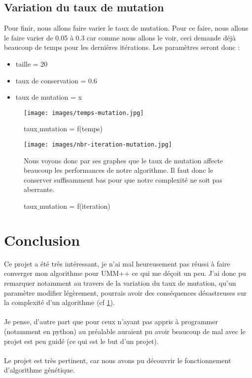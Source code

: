 \documentclass[french,12pt,a4paper]{report}
\begin{document}
\newpage

\section{Variation du taux de mutation}
\label{taux mutation}
Pour finir, nous allons faire varier le taux de mutation. Pour ce faire, nous allons le faire varier de 0.05 à 0.3 car comme nous allons le voir, ceci demande déjà beaucoup de temps pour les dernières itérations. Les paramètres seront donc :
\begin{itemize}
\item taille = 20
\item taux de conservation = 0.6
\item taux de mutation = x
\end{itemize}
\begin{figure}[!htb]
\begin{minipage}{0.48\textwidth}
\centering
\texttt{[image: images/temps-mutation.jpg]}
\caption{taux$\_$mutation = f(temps)}\label{Fig:Data1-3}
\end{minipage}\hfill
\begin{minipage}{0.48\textwidth}
\centering
\texttt{[image: images/nbr-iteration-mutation.jpg]}
\caption{taux$\_$mutation = f(iteration)}\label{Fig:Data2-3}
\end{minipage}
Nous voyons donc par ses graphes que le taux de mutation affecte beaucoup les performances de notre algorithme. Il faut donc le conserver suffisamment bas pour que notre complexité ne soit pas aberrante.
\end{figure}

\chapter*{Conclusion}

Ce projet a été très intéressant, je n'ai mal heureusement pas réussi à faire converger mon algorithme pour UMM++ ce qui me déçoit un peu. J'ai donc pu remarquer notamment au travers de la variation du taux de mutation, qu'un paramètre modifier légèrement, pourrais avoir des conséquences désastreuses sur la complexité d'un algorithme (cf \ref{taux mutation}). \\ \\
Je pense, d'autre part que pour ceux n'ayant pas appris à programmer (notamment en python) au préalable auraient pu avoir beaucoup de mal avec le projet est peu guidé (ce qui est le but d'un projet).\\ \\

Le projet est très pertinent, car nous avons pu découvrir le fonctionnement d'algorithme génétique.
\end{document}
